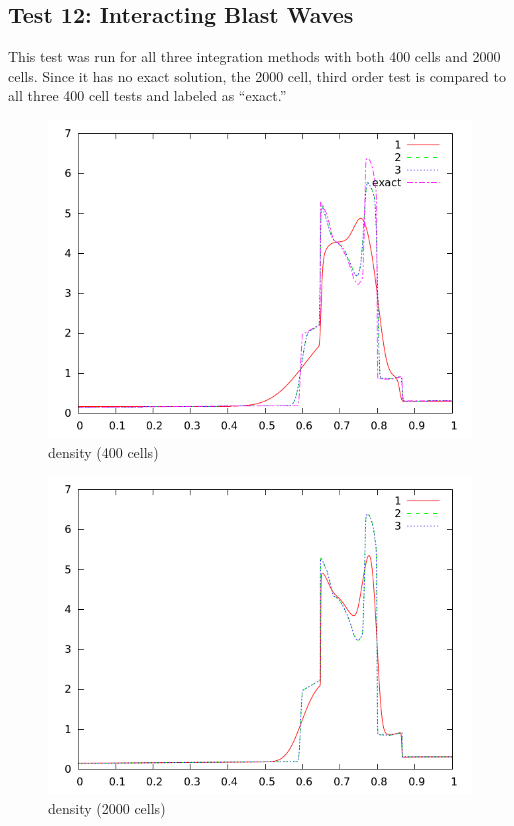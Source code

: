 \documentclass[letterpaper,12pt]{article}
\begin{document}
\clearpage

\subsection{Test 12: Interacting Blast Waves}
This test was run for all three integration methods with both 400 cells and 2000 cells. Since it has no exact solution, the 2000 cell, third order test is compared to all three 400 cell tests and labeled as ``exact.''

\begin{figure}[h]
  \begin{center}
     \includegraphics[width=.78\textwidth]{den_T12_400.png}	
  \end{center}
  \caption{density (400 cells)}
\end{figure}

\begin{figure}[h]
  \begin{center}
     \includegraphics[width=.78\textwidth]{den_T12_2000.png}	
  \end{center}
  \caption{density (2000 cells)}
\end{figure}
\end{document}

